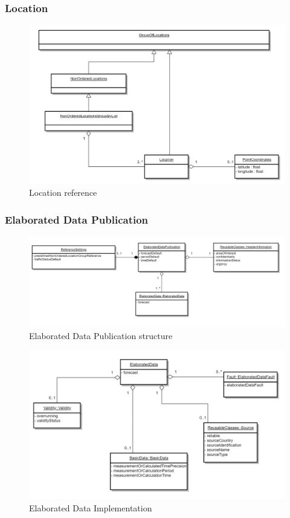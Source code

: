 \subsubsection{Location}
\begin{figure}
	\begin{center}
		\includegraphics[width=1\columnwidth]{images/uml_3_3}
	\end{center}
	\caption{Location reference}
	\label{fig:app_uml_3_3}
\end{figure}
\subsubsection{Elaborated Data Publication}
\begin{figure}
	\begin{center}
		\includegraphics[width=1\columnwidth]{images/uml_3_6}
	\end{center}
	\caption{Elaborated Data Publication structure}
	\label{fig:app_uml_3_6}
\end{figure}
\begin{figure}
	\begin{center}
		\includegraphics[width=0.7\columnwidth]{images/uml_4_30}
	\end{center}
	\caption{Elaborated Data Implementation}
	\label{fig:app_uml_4_30}
\end{figure}
